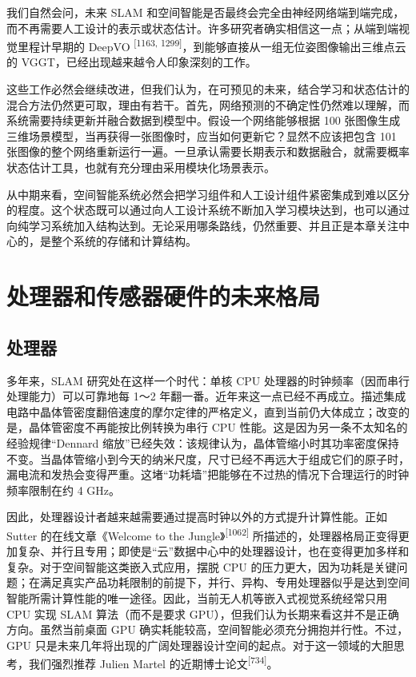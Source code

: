 我们自然会问，未来 SLAM 和空间智能是否最终会完全由神经网络端到端完成，而不再需要人工设计的表示或状态估计。许多研究者确实相信这一点；从端到端视觉里程计早期的 DeepVO \textsuperscript{[1163, 1299]}，到能够直接从一组无位姿图像输出三维点云的 VGGT，已经出现越来越令人印象深刻的工作。

这些工作必然会继续改进，但我们认为，在可预见的未来，结合学习和状态估计的混合方法仍然更可取，理由有若干。首先，网络预测的不确定性仍然难以理解，而系统需要持续更新并融合数据到模型中。假设一个网络能够根据 100 张图像生成三维场景模型，当再获得一张图像时，应当如何更新它？显然不应该把包含 101 张图像的整个网络重新运行一遍。一旦承认需要长期表示和数据融合，就需要概率状态估计工具，也就有充分理由采用模块化场景表示。

从中期来看，空间智能系统必然会把学习组件和人工设计组件紧密集成到难以区分的程度。这个状态既可以通过向人工设计系统不断加入学习模块达到，也可以通过向纯学习系统加入结构达到。无论采用哪条路线，仍然重要、并且正是本章关注中心的，是整个系统的存储和计算结构。

\section{处理器和传感器硬件的未来格局}

\subsection{处理器}

多年来，SLAM 研究处在这样一个时代：单核 CPU 处理器的时钟频率（因而串行处理能力）可以可靠地每 1～2 年翻一番。近年来这一点已经不再成立。描述集成电路中晶体管密度翻倍速度的摩尔定律的严格定义，直到当前仍大体成立；改变的是，晶体管密度不再能按比例转换为串行 CPU 性能。这是因为另一条不太知名的经验规律“Dennard 缩放”已经失效：该规律认为，晶体管缩小时其功率密度保持不变。当晶体管缩小到今天的纳米尺度，尺寸已经不再远大于组成它们的原子时，漏电流和发热会变得严重。这堵“功耗墙”把能够在不过热的情况下合理运行的时钟频率限制在约 4 GHz。

因此，处理器设计者越来越需要通过提高时钟以外的方式提升计算性能。正如 Sutter 的在线文章《Welcome to the Jungle》\textsuperscript{[1062]} 所描述的，处理器格局正变得更加复杂、并行且专用；即使是“云”数据中心中的处理器设计，也在变得更加多样和复杂。对于空间智能这类嵌入式应用，摆脱 CPU 的压力更大，因为功耗是关键问题；在满足真实产品功耗限制的前提下，并行、异构、专用处理器似乎是达到空间智能所需计算性能的唯一途径。因此，当前无人机等嵌入式视觉系统经常只用 CPU 实现 SLAM 算法（而不是要求 GPU），但我们认为长期来看这并不是正确方向。虽然当前桌面 GPU 确实耗能较高，空间智能必须充分拥抱并行性。不过，GPU 只是未来几年将出现的广阔处理器设计空间的起点。对于这一领域的大胆思考，我们强烈推荐 Julien Martel 的近期博士论文\textsuperscript{[734]}。

